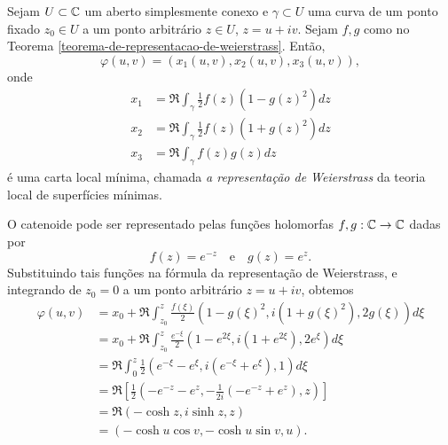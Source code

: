 \begin{definicao}
	Sejam $U \subset \mathbb{C}$ um aberto simplesmente conexo e $\gamma \subset U$ uma curva de um ponto fixado $z_0 \in U$ a um ponto arbitrário $z \in U$, $z = u + iv$.
	Sejam $f,g$ como no Teorema \ref{teorema-de-representacao-de-weierstrass}. Então,
	\begin{equation*}
	\varphi(u,v) = (x_1(u,v), x_2(u,v), x_3(u,v)),
	\end{equation*}
	onde
	\begin{align*}
	x_1 &= \Re \int_{\gamma} \frac{1}{2} f(z) (1 - g(z)^2) dz\\
	x_2 &= \Re \int_{\gamma} \frac{1}{2} f(z) (1 + g(z)^2) dz\\
	x_3 &= \Re \int_{\gamma} f(z) g(z) dz
	\end{align*}
	é uma carta local mínima, chamada \emph{a representação de Weierstrass} da teoria local de superfícies mínimas.
\end{definicao}

\begin{exemplo}[Catenoide]
	O catenoide pode ser representado pelas funções holomorfas $f, g: \mathbb{C} \rightarrow \mathbb{C}$ dadas por
	\begin{equation*}
	f(z) = e^{-z} \quad \text{e} \quad
	g(z) = e^z.
	\end{equation*}
	Substituindo tais funções na fórmula da representação de Weierstrass, e integrando de $z_0 = 0$ a um ponto arbitrário $z = u + iv$, obtemos
	\begin{align*}
	\varphi(u,v) &= x_0 + \Re \int_{z_0}^{z} \frac{f(\xi)}{2} (1 - g(\xi)^2, i (1 + g(\xi)^2), 2 g(\xi)) d\xi\\
	&= x_0 + \Re \int_{z_0}^{z} \frac{e^{-\xi}}{2} (1 - e^{2\xi}, i (1 + e^{2\xi}), 2e^{\xi}) d\xi\\
	&= \Re \int_{0}^{z} \frac{1}{2} (e^{-\xi} - e^{\xi}, i (e^{-\xi} + e^{\xi}), 1) d\xi\\
	&= \Re \left[ \frac{1}{2} \left(-e^{-z} - e^z, -\frac{1}{2i} (-e^{-z} + e^z), z \right) \right] \\
	&= \Re \left( -\cosh z, i \sinh z, z \right) \\
	&= \left( -\cosh u \cos v, -\cosh u \sin v, u \right).
	\end{align*} 
\end{exemplo}

